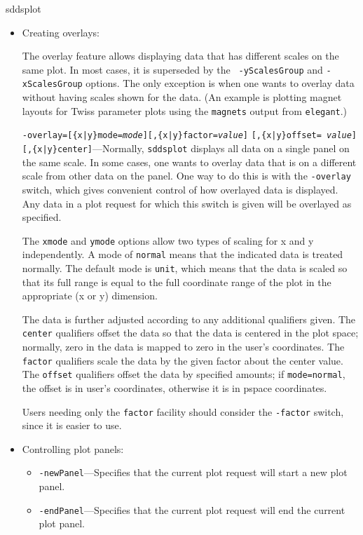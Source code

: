 \begin{sddsprog}{sddsplot}
\begin{itemize}
\begin{itemize}
  \end{itemize}

\item Creating overlays:

The overlay feature allows displaying data that has different scales
on the same plot.  In most cases, it is superseded by the {\tt
-yScalesGroup} and {\tt -xScalesGroup} options.  The only exception is
when one wants to overlay data without having scales shown for the
data.  (An example is plotting magnet layouts for Twiss parameter
plots using the {\tt magnets} output from {\tt elegant}.)

{\tt -overlay=[\{x|y\}mode={\em mode}][,\{x|y\}factor={\em value}]} {\tt [,\{x|y\}offset={\em
value}]} {\tt [,\{x|y\}center]}---Normally, \verb|sddsplot| displays all data on a single panel on the same
scale.  In some cases, one wants to overlay data that is on a different scale from other data on the
panel.  One way to do this is with the {\tt -overlay} switch, which gives convenient control of how
overlayed data is displayed.  Any data in a plot request for which this switch is given will be
overlayed as specified.

The {\tt xmode} and {\tt ymode} options allow two types of scaling for x and y independently.  A mode
of {\tt normal} means that the indicated data is treated normally.  The default mode is {\tt unit},
which means that the data is scaled so that its full range is equal to the full coordinate range of
the plot in the appropriate (x or y) dimension.

The data is further adjusted according to any additional qualifiers given.  The {\tt center}
qualifiers offset the data so that the data is centered in the plot space; normally, zero in the data
is mapped to zero in the user's coordinates.  The {\tt factor} qualifiers scale the data by the given
factor about the center value.  The {\tt offset} qualifiers offset the data by specified amounts; if
{\tt mode=normal}, the offset is in user's coordinates, otherwise it is in pspace coordinates.

Users needing only the {\tt factor} facility should consider the {\tt -factor} switch, since it is
easier to use.

\item Controlling plot panels:
  \begin{itemize}
  \item {\tt -newPanel}---Specifies that the current plot request will start a new plot panel.
  \item {\tt -endPanel}---Specifies that the current plot request will end the current plot panel.


\end{itemize}
\end{itemize}
\end{sddsprog}
